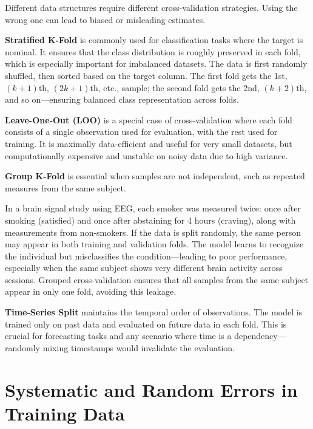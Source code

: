 \documentclass[12pt,openany]{book}
\begin{document}
Different data structures require different cross-validation strategies. Using the wrong one can lead to biased or misleading estimates. \newline

\textbf{Stratified K-Fold} is commonly used for classification tasks where the target is nominal. It ensures that the class distribution is roughly preserved in each fold, which is especially important for imbalanced datasets. The data is first randomly shuffled, then sorted based on the target column. The first fold gets the 1st, $(k+1)$th, $(2k+1)$th, etc., sample; the second fold gets the 2nd, $(k+2)$th, and so on—ensuring balanced class representation across folds. \newline

\textbf{Leave-One-Out (LOO)} is a special case of cross-validation where each fold consists of a single observation used for evaluation, with the rest used for training. It is maximally data-efficient and useful for very small datasets, but computationally expensive and unstable on noisy data due to high variance. \newline

\textbf{Group K-Fold} is essential when samples are not independent, such as repeated measures from the same subject.

\begin{examplebox}
In a brain signal study using EEG, each smoker was measured twice: once after smoking (satisfied) and once after abstaining for 4 hours (craving), along with measurements from non-smokers. If the data is split randomly, the same person may appear in both training and validation folds. The model learns to recognize the individual but misclassifies the condition—leading to poor performance, especially when the same subject shows very different brain activity across sessions. Grouped cross-validation ensures that all samples from the same subject appear in only one fold, avoiding this leakage.
\end{examplebox}

\textbf{Time-Series Split} maintains the temporal order of observations. The model is trained only on past data and evaluated on future data in each fold. This is crucial for forecasting tasks and any scenario where time is a dependency—randomly mixing timestamps would invalidate the evaluation.




\section{Systematic and Random Errors in Training Data}
\end{document}
